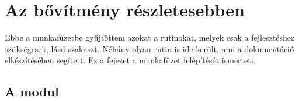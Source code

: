 
\chapter{Az  bővítmény részletesebben}
\label{chap:6}


Ebbe a munkafüzetbe gyűjtöttem azokat a rutinokat, melyek csak a
fejlesztéshez szükségesek, 
lásd  szakaszt. Néhány olyan rutin is ide került, ami a
dokumentáció elkészítésében 
segített. Ez a fejezet a munkafüzet felépítését ismerteti.

\section{A  modul}\label{sec:6.1}

